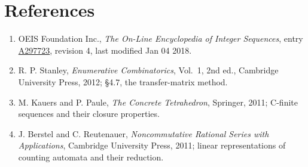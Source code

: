 \documentclass[11pt]{article}
\theoremstyle{definition}
\begin{document}
\section{References}

\begin{enumerate}

\item OEIS Foundation Inc., \emph{The On-Line Encyclopedia of Integer Sequences}, entry \href{https://oeis.org/A297723}{A297723}, revision 4, last modified Jan 04 2018.

\item R. P. Stanley, \emph{Enumerative Combinatorics}, Vol.~1, 2nd ed., Cambridge University Press, 2012; \S4.7, the transfer-matrix method.

\item M. Kauers and P. Paule, \emph{The Concrete Tetrahedron}, Springer, 2011; C-finite sequences and their closure properties.

\item J. Berstel and C. Reutenauer, \emph{Noncommutative Rational Series with Applications}, Cambridge University Press, 2011; linear representations of counting automata and their reduction.

\end{enumerate}
\end{document}
